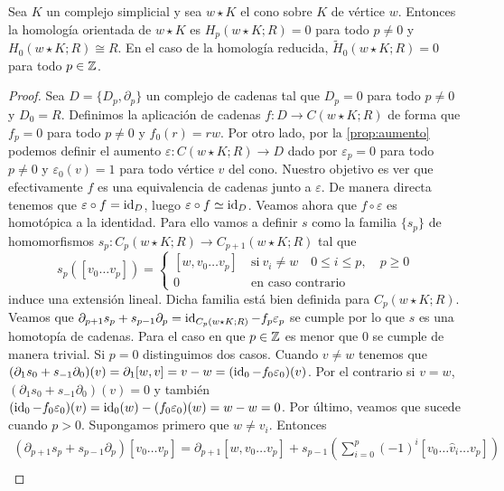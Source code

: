 \begin{proposicion}
	Sea $K$ un complejo simplicial y sea $w \star K$ el cono sobre $K$ de vértice $w$. Entonces la homología orientada de  $w \star K$ es $H_p(w \star K;R) = 0$ para todo $p \neq 0$ y $H_0(w \star K;R) \cong R$. En el caso de la homología reducida, $\widetilde{H}_0(w \star K;R) = 0$ para todo $p \in \mathbb{Z}$.
\end{proposicion}
\begin{proof}
	Sea $D = \{D_p, \partial_p\}$ un complejo de cadenas tal que $D_p = 0$ para todo $p \neq 0$ y $D_0 = R$. Definimos la aplicación de cadenas $f: D \to C(w \star K;R)$ de forma que $f_p = 0$ para todo $p \neq 0$ y $f_0(r)=rw$. Por otro lado, por la \autoref{prop:aumento} podemos definir el aumento $\varepsilon: C(w \star K;R) \to D$ dado por $\varepsilon_p=0$ para todo $p \neq 0$ y $\varepsilon_0(v) = 1$ para todo vértice $v$ del cono. Nuestro objetivo es ver que efectivamente $f$ es una equivalencia de cadenas junto a $\varepsilon$. De manera directa tenemos que $\varepsilon \circ f = \operatorname{id}_D$, luego $\varepsilon \circ f \simeq \operatorname{id}_D$. Veamos ahora que $f \circ \varepsilon$ es homotópica a la identidad. Para ello vamos a definir $s$ como la familia $\{s_p\}$ de homomorfismos $s_p: C_p(w \star K;R) \to C_{p+1}(w \star K;R)$ tal que
	\[
	s_p([v_0\dots v_p]) =
	\begin{cases}
		[w,v_0 \dots v_p] \ &\text{si} \ v_i \neq w \quad 0 \leq i \leq p,\quad p \geq 0 \\
		0 \ & \text{en caso contrario}
	\end{cases}
	\]
	induce una extensión lineal. Dicha familia está bien definida para $C_p(w \star K;R)$. Veamos que $\partial_{p+1}s_p + s_{p-1}\partial_p = \operatorname{id}_{C_p(w \star K;R)} - f_p\varepsilon_p$ se cumple por lo que $s$ es una homotopía de cadenas. Para el caso en que $p \in \mathbb{Z}$ es menor que $0$ se cumple de manera trivial. Si $p = 0$ distinguimos dos casos. Cuando $v \neq w$ tenemos que $(\partial_1s_0+s_{-1}\partial_0)(v) = \partial_1[w,v] = v-w = (\operatorname{id}_0 - f_0\varepsilon_0)(v)$. Por el contrario si $v = w$, $(\partial_1s_0+s_{-1}\partial_0)(v) = 0$ y también $(\operatorname{id}_0 - f_0\varepsilon_0)(v) = \operatorname{id}_0(w) - (f_0\varepsilon_0)(w) = w - w = 0$. Por último, veamos que sucede cuando $p > 0$. Supongamos primero que $w \neq v_i$. Entonces
	\begin{gather*}
	(\partial_{p+1}s_{p} + s_{p-1} \partial_p)[v_0 \dots v_p] =\partial_{p+1}[w,v_{0}\dots v_{p}]+s_{p-1}\left(\sum_{i=0}^{p}(-1)^{i}[v_{0}\dots\hat{v}_{i}\dots v_{p}]\right) \\

\end{gather*}
\end{proof}

